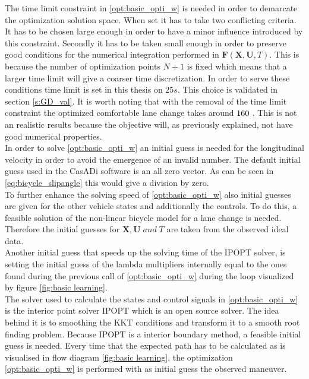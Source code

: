 The time limit constraint in \ref{opt:basic_opti_w} is needed in order to demarcate the optimization solution space. When set it has to take two conflicting criteria. It has to be chosen large enough in order to have a minor influence introduced by this constraint. Secondly it has to be taken small enough in order to preserve good conditions for the numerical integration performed in $\bm{F}(\bm{X},\bm{U}, T)$. This is because the number of optimization points $N+1$ is fixed which means that a larger time limit will give a coarser time discretization. In order to serve these conditions time limit is set in this thesis on $25 s$. This choice is validated in section \ref{s:GD_val}. It is worth noting that with the removal of the time limit constraint the optimized comfortable lane change takes around $160 \hspace{1mm}$. This is not an realistic results because the objective will, as previously explained, not have good numerical properties.\\ 

In order to solve \ref{opt:basic_opti_w} an initial guess is needed for the longitudinal velocity in order to avoid the emergence of an invalid number. The default initial guess used in the CasADi software is an all zero vector. As can be seen in \ref{eq:bicycle_slipangle} this would give a division by zero. \\
To further enhance the solving speed of \ref{opt:basic_opti_w} also initial guesses are given for the other vehicle states and additionally the controls. To do this, a feasible solution of the non-linear bicycle model for a lane change is needed. Therefore the initial guesses for $\bm{X}, \bm{U} \;and\; T$ are taken from the observed ideal data. \\

Another initial guess that speeds up the solving time of the IPOPT solver, is setting the initial guess of the lambda multipliers internally equal to the ones found during the previous call of \ref{opt:basic_opti_w} during the loop visualized by figure \ref{fig:basic learning}. \\

The solver used to calculate the states and control signals in \ref{opt:basic_opti_w} is the interior point solver IPOPT which is an open source solver. The idea behind it is to smoothing the KKT conditions and transform it to a smooth root finding problem. \cite{Panos_opti} Because IPOPT is a interior boundary method, a feasible initial guess is needed. Every time that the expected path has to be calculated as is visualised in flow diagram \ref{fig:basic learning}, the optimization \ref{opt:basic_opti_w} is performed with as initial guess the observed maneuver.\\


